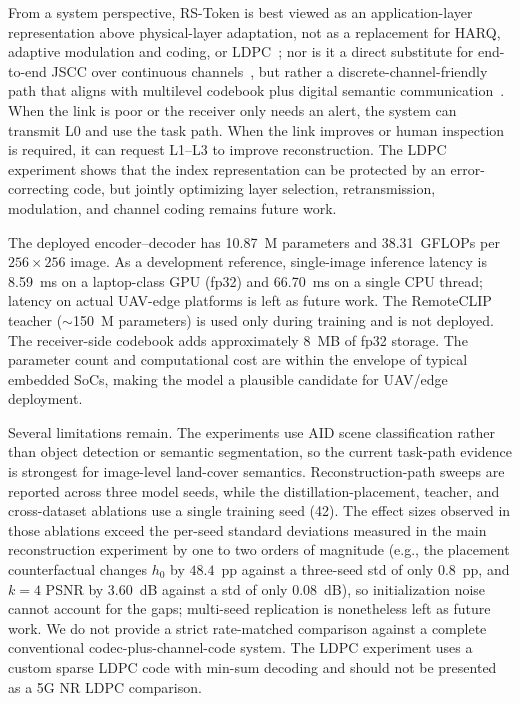 \documentclass[lettersize,journal]{IEEEtran}
\begin{document}
From a system perspective, RS-Token is best viewed as an application-layer representation above physical-layer adaptation, not as a replacement for HARQ, adaptive modulation and coding, or LDPC~\cite{proakis}; nor is it a direct substitute for end-to-end JSCC over continuous channels~\cite{deepjscc}, but rather a discrete-channel-friendly path that aligns with multilevel codebook plus digital semantic communication~\cite{moc-rvq}. When the link is poor or the receiver only needs an alert, the system can transmit L0 and use the task path. When the link improves or human inspection is required, it can request L1--L3 to improve reconstruction. The LDPC experiment shows that the index representation can be protected by an error-correcting code, but jointly optimizing layer selection, retransmission, modulation, and channel coding remains future work.

The deployed encoder--decoder has 10.87~M parameters and 38.31~GFLOPs per $256\times256$ image. As a development reference, single-image inference latency is 8.59~ms on a laptop-class GPU (fp32) and 66.70~ms on a single CPU thread; latency on actual UAV-edge platforms is left as future work. The RemoteCLIP teacher ($\sim$150~M parameters) is used only during training and is not deployed. The receiver-side codebook adds approximately 8~MB of fp32 storage. The parameter count and computational cost are within the envelope of typical embedded SoCs, making the model a plausible candidate for UAV/edge deployment.

Several limitations remain. The experiments use AID scene classification rather than object detection or semantic segmentation, so the current task-path evidence is strongest for image-level land-cover semantics. Reconstruction-path sweeps are reported across three model seeds, while the distillation-placement, teacher, and cross-dataset ablations use a single training seed (42). The effect sizes observed in those ablations exceed the per-seed standard deviations measured in the main reconstruction experiment by one to two orders of magnitude (e.g., the placement counterfactual changes $h_0$ by $48.4$~pp against a three-seed std of only $0.8$~pp, and $k{=}4$ PSNR by $3.60$~dB against a std of only $0.08$~dB), so initialization noise cannot account for the gaps; multi-seed replication is nonetheless left as future work. We do not provide a strict rate-matched comparison against a complete conventional codec-plus-channel-code system. The LDPC experiment uses a custom sparse LDPC code with min-sum decoding and should not be presented as a 5G NR LDPC comparison.
\end{document}
